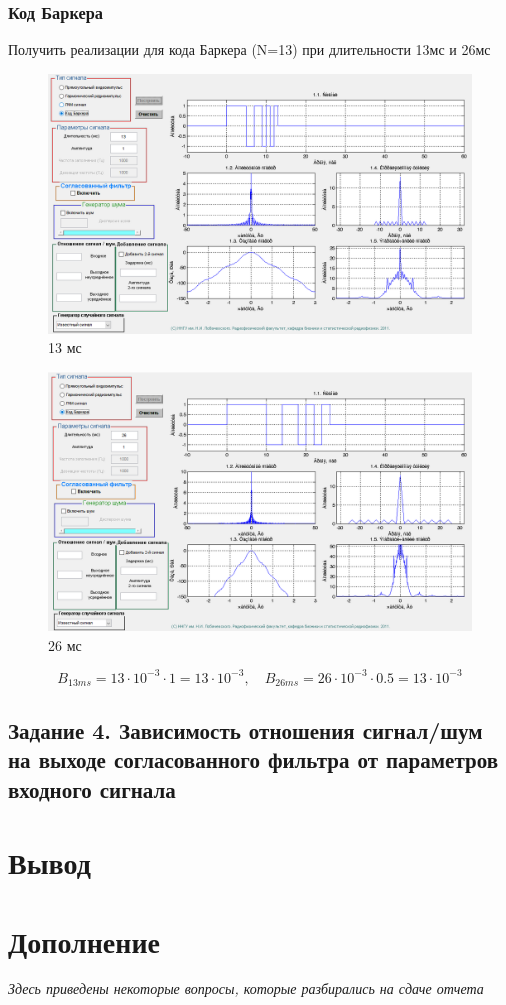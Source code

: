 \subsubsection{Код Баркера}
Получить реализации для кода Баркера (N=13) при длительности 13мс и
26мс
\begin{figure}[H]
    \centering
    \includegraphics[width=0.9\linewidth]{imgs/t1s4_13.png}
    \caption{13 мс}
    \label{fig:task4_13}
\end{figure}
\begin{figure}[H]
    \centering
    \includegraphics[width=0.9\linewidth]{imgs/t1s4_26.png}
    \caption{26 мс}
    \label{fig:task4_26}
\end{figure}

\begin{equation}
    B_{13ms} = 13 \cdot 10^{-3} \cdot 1 = 13 \cdot 10^{-3}, \quad B_{26ms} = 26 \cdot 10^{-3} \cdot 0.5 = 13 \cdot 10^{-3}
    \label{eq:}
\end{equation}




\subsection{Задание 4. Зависимость отношения сигнал/шум на выходе согласованного
фильтра от параметров входного сигнала}





\section{Вывод}


\newpage
\section{Дополнение}
\textit{Здесь приведены некоторые вопросы, которые разбирались на сдаче отчета}

